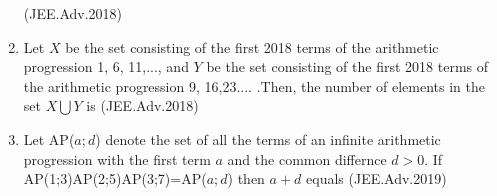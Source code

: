 \documentclass[journal,12pt,twocolumn]{IEEEtran}
\theoremstyle{remark}
\begin{document}
\begin{enumerate}
   \hfill(JEE.Adv.2018)

   \item Let $X$ be the set consisting of the first 2018 terms of the arithmetic progression 1, 6, 11,..., and $Y$ be the set consisting of the first 2018 terms of the arithmetic progression 9, 16,23.... .Then, the number of elements in the set $ X \bigcup Y $ is \hfill(JEE.Adv.2018)
\item Let AP($a;d$) denote the set of all the terms of an infinite arithmetic progression with the first term $a$ and the common differnce $d>0$. If AP(1;3)AP(2;5)AP(3;7)=AP($a;d$) then $a + d$ equals \hfill(JEE.Adv.2019)
   
    \end{enumerate}
   
\end{document}
